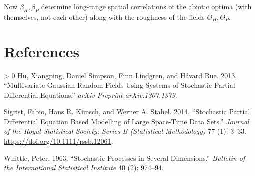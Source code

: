 \documentclass{article}
\newlength{\cslhangindent}
\newenvironment{CSLReferences}[3] %
 {%
  \setlength{\parindent}{0pt}
  \ifodd #1 \everypar{\setlength{\hangindent}{\cslhangindent}}\ignorespaces\fi
  \ifnum #2 > 0
  \setlength{\parskip}{#2\baselineskip}
  \fi
 }%
 {}
\begin{document}
Now \(\beta_H,\beta_P\) determine long-range spatial correlations of the
abiotic optima (with themselves, not each other) along with the
roughness of the fields \(\Theta_H,\Theta_P\).

\newpage

\hypertarget{references}{%
\section*{References}\label{references}}

\hypertarget{refs}{}
\begin{CSLReferences}{1}{0}
\leavevmode\hypertarget{ref-hu2013multivariate}{}%
Hu, Xiangping, Daniel Simpson, Finn Lindgren, and Håvard Rue. 2013.
{``Multivariate Gaussian Random Fields Using Systems of Stochastic
Partial Differential Equations.''} \emph{arXiv Preprint
arXiv:1307.1379}.

\leavevmode\hypertarget{ref-Sigrist2014}{}%
Sigrist, Fabio, Hans R. Künsch, and Werner A. Stahel. 2014.
{``Stochastic Partial Differential Equation Based Modelling of Large
Space-Time Data Sets.''} \emph{Journal of the Royal Statistical Society:
Series B (Statistical Methodology)} 77 (1): 3--33.
\url{https://doi.org/10.1111/rssb.12061}.

\leavevmode\hypertarget{ref-whittle1963stochastic}{}%
Whittle, Peter. 1963. {``Stochastic-Processes in Several Dimensions.''}
\emph{Bulletin of the International Statistical Institute} 40 (2):
974--94.

\end{CSLReferences}



\end{document}
